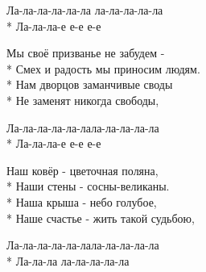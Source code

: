 \medskip

\begin{minipage}{\linewidth}
\hspace*{1.5em}Ла-ла-ла-ла-ла-ла ла-ла-ла-ла-ла\\*
\hspace*{1.5em}Ла-ла-ла-е е-е е-е\\
\end{minipage}\par\medskip\nobreak

\medskip

\begin{minipage}{\linewidth}
Мы своё призванье не забудем -\\*
Смех и радость мы приносим людям.\\*
Нам дворцов заманчивые своды\\*
Не заменят никогда свободы,\\
\end{minipage}\par\medskip\nobreak

\medskip

\begin{minipage}{\linewidth}
\hspace*{1.5em}Ла-ла-ла-ла-ла-лала-ла-ла-ла-ла\\*
\hspace*{1.5em}Ла-ла-ла-е е-е е-е\\
\end{minipage}\par\medskip\nobreak

\medskip

\begin{minipage}{\linewidth}
Наш ковёр - цветочная поляна,\\*
Наши стены - сосны-великаны.\\*
Наша крыша - небо голубое,\\*
Наше счастье - жить такой судьбою,\\
\end{minipage}\par\medskip\nobreak

\medskip

\begin{minipage}{\linewidth}
\hspace*{1.5em}Ла-ла-ла-ла-ла-лала-ла-ла-ла-ла\\*
\hspace*{1.5em}Ла-ла-ла ла-ла-ла-ла-ла\\
\end{minipage}\par\medskip\nobreak

